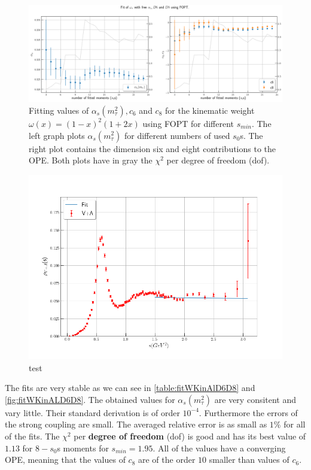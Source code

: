 \documentclass[../../index.tex]{subfiles}
\begin{document}
\begin{figure}[H]
  \centering
  \includegraphics[width=\textwidth]{./images/fitWKinAlD6D8.png}
  \caption{Fitting values of $\alpha_s(m_\tau^2), c_6$ and $c_8$ for the kinematic weight
    $\omega(x)=(1-x)^2(1+2x)$ using FOPT for different $s_{min}$. The left graph plots $\alpha_s(m_\tau^2)$ for
    different numbers of used $s_0$s. The right plot contains the dimension six
    and eight contributions to the OPE. Both plots have in gray the $\chi^2$ per
  degree of freedom (dof).}
  \label{fig:fitWKinAlD6D8}
\end{figure}
\begin{figure}
  \centering
  \includegraphics[width=\textwidth]{./images/fitWKinAlD6D8SpecFunc.png}
  \caption{test}
\end{figure}

The fits are very stable as we can see in \cref{table:fitWKinAlD6D8} and \cref{fig:fitWKinALD6D8}. The obtained
values for $\alpha_s(m_\tau^2)$ are very consitent and vary little. Their standard derivation is of order
$10^{-4}$. Furthermore the errors of the strong coupling are small. The averaged
relative error is as small as $1\%$ for all of the fits. The $\chi^2$ per
\textbf{degree of freedom} (dof) is good and has its best value of $1.13$ for
$8-s_0$s moments for $s_{min}=1.95$. All of the values have a converging OPE,
meaning that the values of $c_8$ are of the order $10$ smaller than values of $c_6$. 
\end{document}
